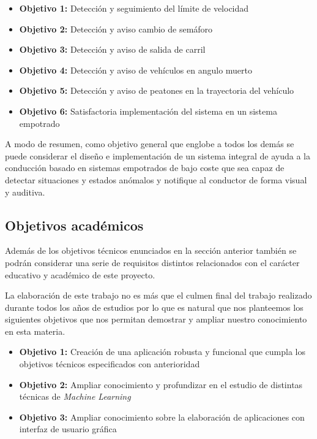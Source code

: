 \begin{itemize}
    \item \textbf{Objetivo 1:} Detección y seguimiento del límite de velocidad
    \item \textbf{Objetivo 2:} Detección y aviso cambio de semáforo
    \item \textbf{Objetivo 3:} Detección y aviso de salida de carril
    \item \textbf{Objetivo 4:} Detección y aviso de vehículos en angulo muerto
    \item \textbf{Objetivo 5:} Detección y aviso de peatones en la trayectoria del vehículo
    \item \textbf{Objetivo 6:} Satisfactoria implementación del sistema en un sistema empotrado
\end{itemize}

A modo de resumen, como objetivo general que englobe a todos los demás se puede considerar el diseño e implementación de un sistema integral de ayuda a la conducción basado en sistemas empotrados de bajo coste que sea capaz de detectar situaciones y estados anómalos y notifique al conductor de forma visual y auditiva.

\subsection{Objetivos académicos}
Además de los objetivos técnicos enunciados en la sección anterior también se podrán considerar una serie de requisitos distintos relacionados con el carácter educativo y académico de este proyecto.

La elaboración de este trabajo no es más que el culmen final del trabajo realizado durante todos los años de estudios por lo que es natural que nos planteemos los siguientes objetivos que nos permitan demostrar y ampliar nuestro conocimiento en esta materia.

\begin{itemize}
    \item \textbf{Objetivo 1:} Creación de una aplicación robusta y funcional que cumpla los objetivos técnicos especificados con anterioridad
    \item \textbf{Objetivo 2:} Ampliar conocimiento y profundizar en el estudio de distintas técnicas de \textit{Machine Learning}
    \item \textbf{Objetivo 3:} Ampliar conocimiento sobre la elaboración de aplicaciones con interfaz de usuario gráfica
\end{itemize}



